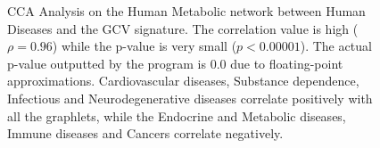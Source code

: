 \begin{figure}
\begin{subfigure}{.65\textwidth}
  \end{subfigure}
  \begin{subfigure}{.25\textwidth}
    \centering 
	
    \gtwo
    \geight
    \gtwentynine
    \gdots
    \gtwentyfive
    \gfive
    \gtwentyseven

  \end{subfigure}
  
\caption[CCA Analysis on the Human Metabolic network between Human Diseases and the GCV signature.]{CCA Analysis on the Human Metabolic network between Human Diseases and the GCV signature. The correlation value is high ($\rho = 0.96$) while the p-value is very small ($p < 0.00001$). The actual p-value outputted by the program is 0.0 due to floating-point approximations. Cardiovascular diseases, Substance dependence, Infectious and Neurodegenerative diseases correlate positively with all the graphlets, while the Endocrine and Metabolic diseases, Immune diseases and Cancers correlate negatively.}
\label{fig:metabolic_diseases_cca}
\end{figure}




